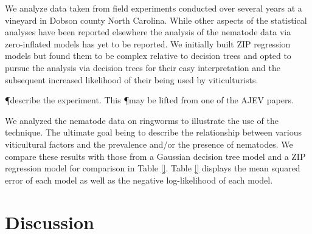 \documentclass{article}
\begin{document}
We analyze data taken from field experiments conducted over several years at a vineyard in Dobson county North Carolina. While other aspects of the statistical analyses have been reported elsewhere \cite{} the analysis of the nematode data via zero-inflated models has yet to be reported. We initially built ZIP regression models but found them to be complex relative to decision trees and opted to pursue the analysis via decision trees for their easy interpretation and the subsequent increased likelihood of their being used by viticulturists. 

\P describe the experiment. This \P may be lifted from one of the AJEV papers. 

We analyzed the nematode data on ringworms to illustrate the use of the technique. The ultimate goal being to describe the relationship between various viticultural factors and the prevalence and/or the presence of nematodes. We compare these results with those from a Gaussian decision tree model and a ZIP regression model for comparison in Table \ref{}. 
Table \ref{} displays the mean squared error of each model as well as the negative log-likelihood of each model. 

\section{Discussion}\label{sec:discussion}



 
\end{document}
